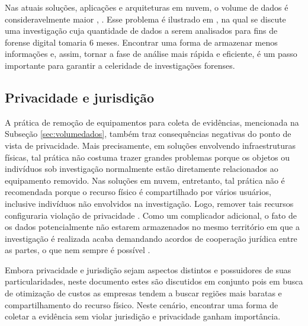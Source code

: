 Nas atuais soluções, aplicações e arquiteturas em nuvem, o volume de dados é consideravelmente maior \cite{QuickIncreaseVolumeImpact:2014}, \cite{Sibiya2015}.
%
Esse problema é ilustrado em \cite{QuickIncreaseVolumeImpact:2014}, na qual se discute uma investigação cuja quantidade de dados a serem analisados para fins de forense digital tomaria 6 meses.
%
Encontrar uma forma de armazenar menos informações e, assim, tornar a fase de análise mais rápida e eficiente, é um passo importante para garantir a celeridade de investigações forenses.


\subsection{Privacidade e jurisdição}
\label{sec:violacaoprivacidadejuriscdicao}

%
%
%
A prática de remoção de equipamentos para coleta de evidências, mencionada na Subseção \ref{sec:volumedados}, também traz consequências negativas do ponto de vista de privacidade.
%
Mais precisamente, em soluções envolvendo infraestruturas físicas, tal prática não costuma trazer grandes problemas porque os objetos ou indivíduos sob investigação normalmente estão diretamente relacionados ao equipamento removido.
%
Nas soluções em nuvem, entretanto, tal prática não é recomendada porque o recurso físico é compartilhado por vários usuários, inclusive indivíduos não envolvidos na investigação.
%
Logo, remover tais recursos configuraria violação de privacidade \cite{BashAdvInForensics:2015}.
%
Como um complicador adicional, o fato de os dados potencialmente não estarem armazenados no mesmo território em que a investigação é realizada acaba demandando acordos de cooperação jurídica entre as partes, o que nem sempre é possível \cite{SimouCloudChlng:2014}.


%
Embora privacidade e jurisdição sejam aspectos distintos e possuidores de suas particularidades, neste documento estes são discutidos em conjunto pois em busca de otimização de custos as empresas tendem a buscar regiões mais baratas e compartilhamento do recurso físico.
%
Neste cenário, encontrar uma forma de coletar a evidência sem violar jurisdição e privacidade ganham importância.


